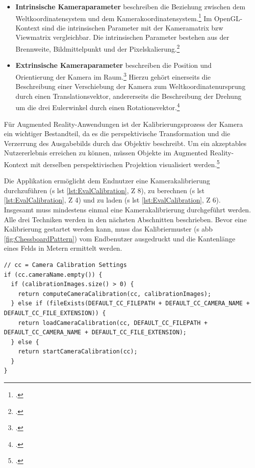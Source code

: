 \begin{itemize}
\item \textbf{Intrinsische Kameraparameter} beschreiben die Beziehung zwischen dem  Weltkoordinatensystem und dem Kamerakoordinatensystem.\footcite{Hofmann2017} Im OpenGL-Kontext sind die intrinsischen Parameter mit der Kameramatrix \acs{bzw} Viewmatrix vergleichbar. Die intrinsischen Parameter bestehen aus der Brennweite, Bildmittelpunkt und der Pixelskalierung.\footcite{Hofmann2017}
\item \textbf{Extrinsische Kameraparameter} \glqq beschreiben die Position und Orientierung der Kamera im Raum.\grqq\footcite{Hofmann2017} Hierzu gehört einerseits die Beschreibung einer Verschiebung der Kamera zum Weltkoordinatenursprung durch einen Translationsvektor, andererseits die Beschreibung der Drehung um die drei Eulerwinkel durch einen Rotationsvektor.\footcite{Hofmann2017}
\end{itemize}

\noindent Für Augmented Reality-Anwendungen ist der Kalibrierungsprozess der Kamera ein wichtiger Bestandteil, da es die perspektivische Transformation und die Verzerrung des Ausgabebilds durch das Objektiv beschreibt. Um ein akzeptables Nutzererlebnis erreichen zu können, müssen Objekte im Augmented Reality-Kontext mit derselben perspektivischen Projektion visualisiert werden.\footcite[Vgl.][\ac{S} 76]{Baggio2012}

Die Applikation ermöglicht dem Endnutzer eine Kamerakalibrierung durchzuführen (\acs{s} \acs{lst} \ref{lst:EvalCalibration}, \acs{Z} 8), zu berechnen (\acs{s} \acs{lst} \ref{lst:EvalCalibration}, \acs{Z} 4) und zu laden (\acs{s} \acs{lst} \ref{lst:EvalCalibration}, \acs{Z} 6). Insgesamt muss mindestens einmal eine Kamerakalibrierung durchgeführt werden. Alle drei Techniken werden in den nächsten Abschnitten beschrieben. Bevor eine Kalibrierung gestartet werden kann, muss das Kalibriermuster (\acs{s} \acs{abb} \ref{fig:ChessboardPattern}) vom Endbenutzer ausgedruckt und die Kantenlänge eines Felds in Metern ermittelt werden.

\begin{lstlisting}[caption={Ein Ausschnitt der Funktion \texttt{camera.cpp/initializeCamera();} die überprüft, auf welche Art und Weise die Kamerakalibrierung durchgeführt werden soll}, label={lst:EvalCalibration}]
// cc = Camera Calibration Settings
if (cc.cameraName.empty()) {
  if (calibrationImages.size() > 0) {
    return computeCameraCalibration(cc, calibrationImages);
  } else if (fileExists(DEFAULT_CC_FILEPATH + DEFAULT_CC_CAMERA_NAME + DEFAULT_CC_FILE_EXTENSION)) {
    return loadCameraCalibration(cc, DEFAULT_CC_FILEPATH + DEFAULT_CC_CAMERA_NAME + DEFAULT_CC_FILE_EXTENSION);
  } else {
    return startCameraCalibration(cc);
  }
}
\end{lstlisting}

